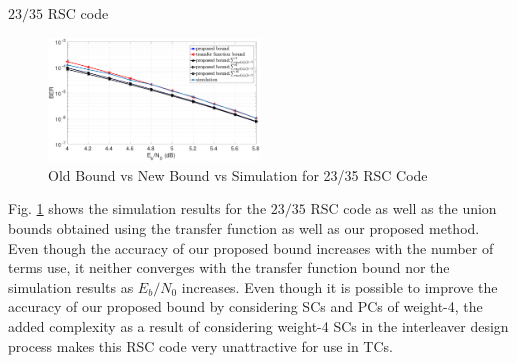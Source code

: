 \begin{example}{$23/35$ RSC code}
\begin{figure}[htbp]
	\centering
	\includegraphics[width=0.5\textwidth]{./Images/RSC_23_35_lower_weights2.eps}
	\caption{Old Bound vs New Bound vs Simulation for 23/35 RSC Code}
	\label{simFig3}
\end{figure}
Fig. \ref{simFig3} shows the simulation results for the $23/35$ RSC code as well as the union bounds obtained using the transfer function as well as our proposed method. Even though the accuracy of our proposed bound increases with the number of terms use, it neither converges with the transfer function bound nor the simulation results as $E_b/N_0$ increases. Even though it is possible to improve the accuracy of our proposed bound by considering SCs and PCs of weight-4, the added complexity as a result of considering weight-4 SCs in the interleaver design process makes this RSC code very unattractive for use in TCs. 
\end{example}





